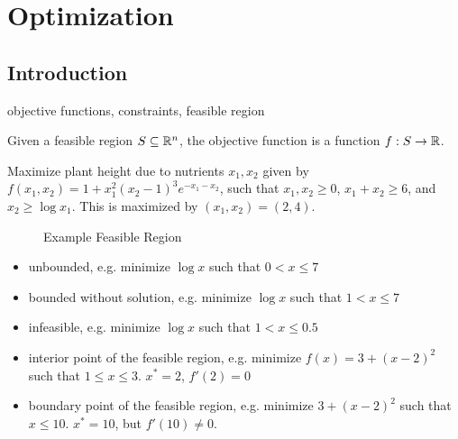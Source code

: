 \chapter{Optimization}
\label{ch:optimization}

\section{Introduction}

objective functions, constraints, feasible region

Given a feasible region $S \subseteq \mathbb{R}^n$, the objective function is a function $f: S \to \mathbb{R}$.

Maximize plant height due to nutrients $x_1, x_2$ given by $f(x_1, x_2) = 1 + x_1^2(x_2 - 1)^3e^{-x_1-x_2}$, such that $x_1, x_2 \geq 0$, $x_1 + x_2 \geq 6$, and $x_2 \geq \log x_1$. This is maximized by $(x_1, x_2) = (2, 4)$.

\begin{figure}[ht!]
    \centering
\caption{Example Feasible Region}
\label{fig:example-feasible-region}
\end{figure}

\begin{itemize}
    \item unbounded, e.g. minimize $\log x$ such that $0 < x \leq 7$
    \item bounded without solution, e.g. minimize $\log x$ such that $1 < x \leq 7$
    \item infeasible, e.g. minimize $\log x$ such that $1 < x \leq 0.5$
    \item interior point of the feasible region, e.g. minimize $f(x) = 3 + (x - 2)^2$ such that $1 \leq x \leq 3$. $x^* = 2$, $f'(2) = 0$
    \item boundary point of the feasible region, e.g. minimize $3 + (x - 2)^2$ such that $x \leq 10$. $x^* = 10$, but $f'(10) \neq 0$.
\end{itemize}

